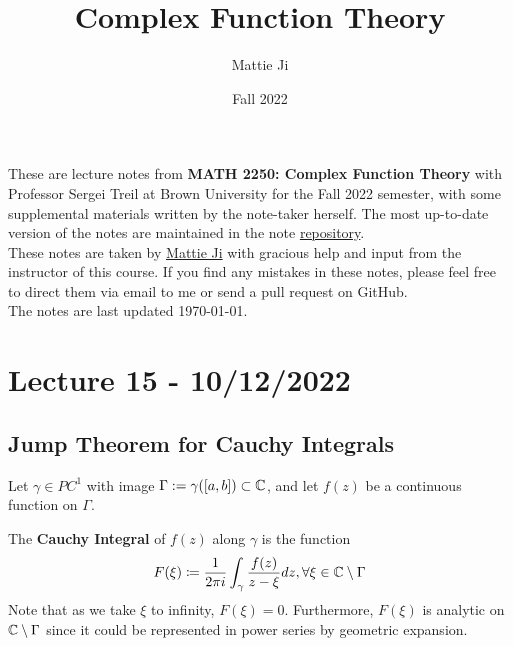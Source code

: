 \documentclass{article}
\title{Complex Function Theory}
\author{Mattie Ji}
\date{Fall 2022}
\begin{document}
\maketitle
These are lecture notes from \textbf{MATH 2250: Complex Function Theory} with Professor Sergei Treil at Brown University for the Fall 2022 semester, with some supplemental materials written by the note-taker herself. The most up-to-date version of the notes are maintained in the note \href{https://github.com/maroon-scorch/MATH2550-notes}{repository}.\\

These notes are taken by \href{https://github.com/maroon-scorch}{Mattie Ji} with gracious help and input from the instructor of this course. If you find any mistakes in these notes, please feel free to direct them via email to me or send a pull request on GitHub.\\

The notes are last updated \today.
\tableofcontents
\newpage
















\section{Lecture 15 - 10/12/2022}

\subsection{Jump Theorem for Cauchy Integrals}
Let $\gamma \in PC^1$ with image $\Gamma := \gamma([a, b]) \subset \mathbb{C}$, and let $f(z)$ be a continuous function on $\Gamma$.

\begin{definition}
The \textbf{Cauchy Integral} of $f(z)$ along $\gamma$ is the function
\[F(\xi) \coloneqq \frac{1}{2\pi i} \int_\gamma \frac{f(z)}{z - \xi} dz, \forall \xi \in \mathbb{C} \setminus \Gamma\]
Note that as we take $\xi$ to infinity, $F(\xi) = 0$. Furthermore, $F(\xi)$ is analytic on $\mathbb{C} \setminus \Gamma$ since it could be represented in power series by geometric expansion.
\end{definition}
\end{document}
